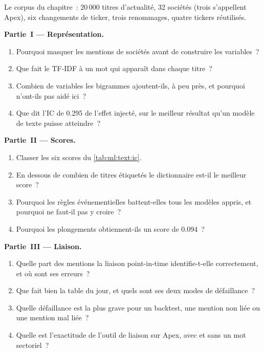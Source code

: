 \begin{problem}\label{pb:ml:text-from-bag-of-words-to-embeddings:1}
Le corpus du chapitre~: 20\,000 titres d'actualité, 32 sociétés (trois s'appellent Apex), six changements de ticker, trois renommages, quatre
tickers réutilisés.

\medskip\noindent\textbf{Partie~I --- Représentation.}
\begin{enumerate}
\item Pourquoi masquer les mentions de sociétés avant de construire les variables~?
\item Que fait le TF-IDF à un mot qui apparaît dans chaque titre~?
\item Combien de variables les bigrammes ajoutent-ils, à peu près, et pourquoi n'ont-ils pas aidé ici~?
\item Que dit l'IC de 0.295 de l'effet injecté, sur le meilleur résultat qu'un modèle de texte puisse atteindre~?
\end{enumerate}

\medskip\noindent\textbf{Partie~II --- Scores.}
\begin{enumerate}[resume]
\item Classer les six scores du \cref{tab:ml:text:ic}.
\item En dessous de combien de titres étiquetés le dictionnaire est-il le meilleur score~?
\item Pourquoi les règles événementielles battent-elles tous les modèles appris, et pourquoi ne faut-il pas y croire~?
\item Pourquoi les plongements obtiennent-ils un score de 0.094~?
\end{enumerate}

\medskip\noindent\textbf{Partie~III --- Liaison.}
\begin{enumerate}[resume]
\item Quelle part des mentions la liaison point-in-time identifie-t-elle correctement, et où sont ses erreurs~?
\item Que fait bien la table du jour, et quels sont ses deux modes de défaillance~?
\item Quelle défaillance est la plus grave pour un backtest, une mention non liée ou une mention mal liée~?
\item Quelle est l'exactitude de l'outil de liaison sur Apex, avec et sans un mot sectoriel~?
\end{enumerate}


\end{problem}
